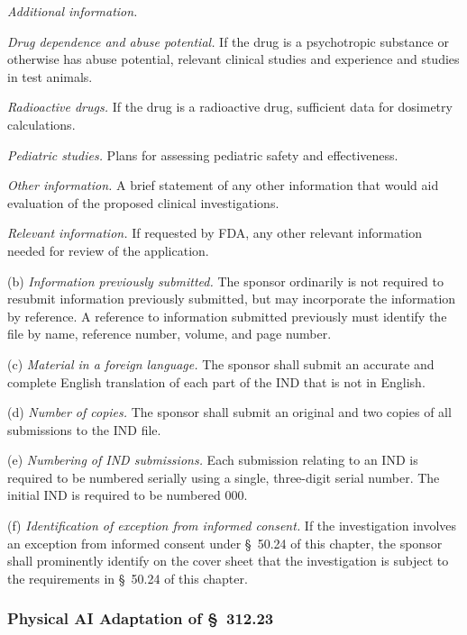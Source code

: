 \documentclass[11pt]{article}
\begin{document}
\begin{description}[leftmargin=0.5cm,style=sameline]
\item[(10)] \textit{Additional information.}
\begin{description}[leftmargin=0.8cm,style=sameline]
\item[(i)] \textit{Drug dependence and abuse potential.} If the drug is a psychotropic substance or otherwise has abuse potential, relevant clinical studies and experience and studies in test animals.
\item[(ii)] \textit{Radioactive drugs.} If the drug is a radioactive drug, sufficient data for dosimetry calculations.
\item[(iii)] \textit{Pediatric studies.} Plans for assessing pediatric safety and effectiveness.
\item[(iv)] \textit{Other information.} A brief statement of any other information that would aid evaluation of the proposed clinical investigations.
\end{description}

\item[(11)] \textit{Relevant information.} If requested by FDA, any other relevant information needed for review of the application.
\end{description}

(b) \textit{Information previously submitted.} The sponsor ordinarily is not required to resubmit information previously submitted, but may incorporate the information by reference. A reference to information submitted previously must identify the file by name, reference number, volume, and page number.

(c) \textit{Material in a foreign language.} The sponsor shall submit an accurate and complete English translation of each part of the IND that is not in English.

(d) \textit{Number of copies.} The sponsor shall submit an original and two copies of all submissions to the IND file.

(e) \textit{Numbering of IND submissions.} Each submission relating to an IND is required to be numbered serially using a single, three-digit serial number. The initial IND is required to be numbered 000.

(f) \textit{Identification of exception from informed consent.} If the investigation involves an exception from informed consent under \S~50.24 of this chapter, the sponsor shall prominently identify on the cover sheet that the investigation is subject to the requirements in \S~50.24 of this chapter.

\subsubsection{Physical AI Adaptation of \S~312.23}
\end{document}
